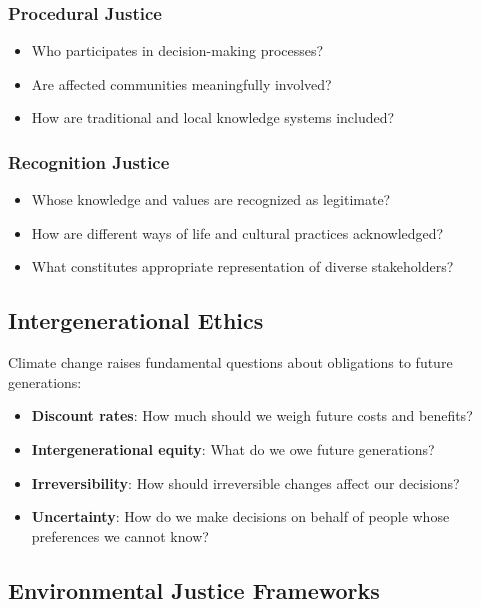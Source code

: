 \documentclass[
  letterpaper,
  DIV=11,
  numbers=noendperiod]{scrreprt}
\providecommand{\tightlist}{%
  \setlength{\itemsep}{0pt}\setlength{\parskip}{0pt}}
\begin{document}
\subsubsection{Procedural Justice}\label{procedural-justice}

\begin{itemize}
\tightlist
\item
  Who participates in decision-making processes?
\item
  Are affected communities meaningfully involved?
\item
  How are traditional and local knowledge systems included?
\end{itemize}

\subsubsection{Recognition Justice}\label{recognition-justice}

\begin{itemize}
\tightlist
\item
  Whose knowledge and values are recognized as legitimate?
\item
  How are different ways of life and cultural practices acknowledged?
\item
  What constitutes appropriate representation of diverse stakeholders?
\end{itemize}

\subsection{Intergenerational Ethics}\label{intergenerational-ethics}

Climate change raises fundamental questions about obligations to future
generations:

\begin{itemize}
\tightlist
\item
  \textbf{Discount rates}: How much should we weigh future costs and
  benefits?
\item
  \textbf{Intergenerational equity}: What do we owe future generations?
\item
  \textbf{Irreversibility}: How should irreversible changes affect our
  decisions?
\item
  \textbf{Uncertainty}: How do we make decisions on behalf of people
  whose preferences we cannot know?
\end{itemize}

\subsection{Environmental Justice
Frameworks}\label{environmental-justice-frameworks}
\end{document}
